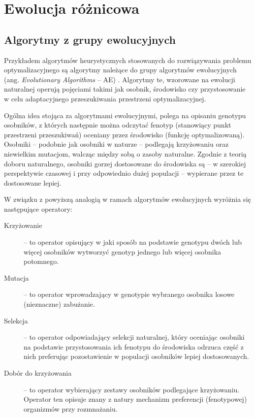 \documentclass[12pt,a4paper]{report}
\begin{document}
{{%
\section{Ewolucja różnicowa}
\label{DEvolChapter}

\subsection{Algorytmy z grupy ewolucyjnych}
\par{
Przykładem algorytmów heurystycznych stosowanych do rozwiązywania problemu optymalizacyjnego są algorytmy należące do grupy algorytmów ewolucyjnych (ang. \emph{Evolutionary Algorithms} -- AE) \cite{WykladyEvol,SpringerIntroToEvol}. Algorytmy te, wzorowane na ewolucji naturalnej operują pojęciami takimi jak osobnik, środowisko czy przystosowanie w celu adaptacyjnego przeszukiwania przestrzeni optymalizacyjnej.
}
\par{
Ogólna idea stojąca za algorytmami ewolucyjnymi, polega na opisaniu genotypu osobników, z których następnie można odczytać fenotyp (stanowiący punkt przestrzeni przeszukiwań) oceniany przez środowisko (funkcję optymalizowaną). Osobniki -- podobnie jak osobniki w naturze -- podlegają krzyżowaniu oraz niewielkim mutacjom, walcząc między sobą o zasoby naturalne. Zgodnie z teorią doboru naturalnego, osobniki gorzej dostosowane do środowiska są -- w szerokiej perspektywie czasowej i przy odpowiednio dużej populacji -- wypierane przez te dostosowane lepiej.
}
\par{
W związku z powyższą analogią w ramach algorytmów ewolucyjnych wyróżnia się następujące operatory:
\begin{description}
  \item[Krzyżowanie] -- to operator opisujący w jaki sposób na podstawie genotypu dwóch lub więcej osobników wytworzyć genotyp jednego lub więcej osobnika potomnego.
  \item[Mutacja] -- to operator wprowadzający w genotypie wybranego osobnika losowe (nieznaczne) zabużanie.
  \item[Selekcja] -- to operator odpowiadający selekcji naturalnej, który oceniając osobniki na podstawie przystosowania ich fenotypu do środowiska odrzuca część z nich preferując pozostawienie w populacji osobników lepiej dostosowanych.
  \item[Dobór do krzyżowania] -- to operator wybierający zestawy osobników podlegające krzyżowaniu. Operator ten opisuje znany z natury mechanizm preferencji (fenotypowej) organizmów przy rozmnażaniu.

\end{description}}}}
\end{document}
